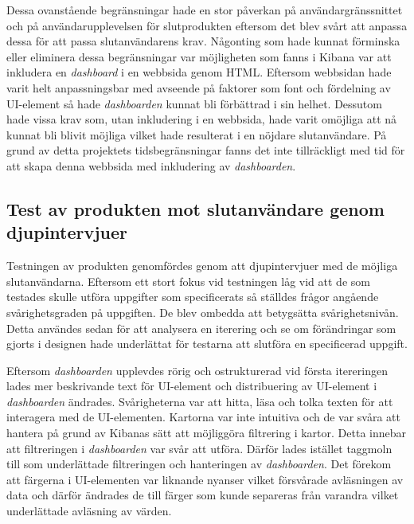 \documentclass[12pt]{kththesis}
\begin{document}
Dessa ovanstående begränsningar hade en stor påverkan på användargränssnittet och på användarupplevelsen för slutprodukten eftersom det blev svårt att anpassa dessa för att passa slutanvändarens krav. Någonting som hade kunnat förminska eller eliminera dessa begränsningar var möjligheten som fanns i Kibana var att inkludera en \textit{dashboard} i en webbsida genom HTML. Eftersom webbsidan hade varit helt anpassningsbar med avseende på faktorer som font och fördelning av UI-element så hade \textit{dashboarden} kunnat bli förbättrad i sin helhet. Dessutom hade vissa krav som, utan inkludering i en webbsida, hade varit omöjliga att nå kunnat bli blivit möjliga vilket hade resulterat i en nöjdare slutanvändare. På grund av detta projektets tidsbegränsningar fanns det inte tillräckligt med tid för att skapa denna webbsida med inkludering av \textit{dashboarden}.  

\subsection{Test av produkten mot slutanvändare genom djupintervjuer} 
Testningen av produkten genomfördes genom att djupintervjuer med de möjliga slutanvändarna. Eftersom ett stort fokus vid testningen låg vid att de som testades skulle utföra uppgifter som specificerats så ställdes frågor angående svårighetsgraden på uppgiften. De blev ombedda att betygsätta svårighetsnivån. Detta användes sedan för att analysera en iterering och se om förändringar som gjorts i designen hade underlättat för testarna att slutföra en specificerad uppgift. 

Eftersom \textit{dashboarden} upplevdes rörig och ostrukturerad vid första itereringen lades mer beskrivande text för UI-element och distribuering av UI-element i \textit{dashboarden} ändrades. Svårigheterna var att hitta, läsa och tolka texten för att interagera med de UI-elementen. Kartorna var inte intuitiva och de var svåra att hantera på grund av Kibanas sätt att möjliggöra filtrering i kartor. Detta innebar att filtreringen i \textit{dashboarden} var svår att utföra. Därför lades istället taggmoln till som underlättade filtreringen och hanteringen av \textit{dashboarden}. Det förekom att färgerna i UI-elementen var liknande nyanser vilket försvårade avläsningen av data och därför ändrades de till färger som kunde separeras från varandra vilket underlättade avläsning av värden.
\end{document}
